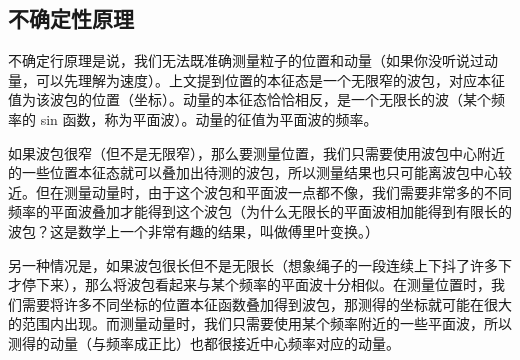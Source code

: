 \subsection{不确定性原理}
不确定行原理是说，我们无法既准确测量粒子的位置和动量（如果你没听说过动量，可以先理解为速度）。上文提到位置的本征态是一个无限窄的波包，对应本征值为该波包的位置（坐标）。动量的本征态恰恰相反，是一个无限长的波（某个频率的 sin 函数，称为平面波）。动量的征值为平面波的频率。

如果波包很窄（但不是无限窄），那么要测量位置，我们只需要使用波包中心附近的一些位置本征态就可以叠加出待测的波包，所以测量结果也只可能离波包中心较近。但在测量动量时，由于这个波包和平面波一点都不像，我们需要非常多的不同频率的平面波叠加才能得到这个波包（为什么无限长的平面波相加能得到有限长的波包？这是数学上一个非常有趣的结果，叫做傅里叶变换。）

另一种情况是，如果波包很长但不是无限长（想象绳子的一段连续上下抖了许多下才停下来），那么将波包看起来与某个频率的平面波十分相似。在测量位置时，我们需要将许多不同坐标的位置本征函数叠加得到波包，那测得的坐标就可能在很大的范围内出现。而测量动量时，我们只需要使用某个频率附近的一些平面波，所以测得的动量（与频率成正比）也都很接近中心频率对应的动量。

